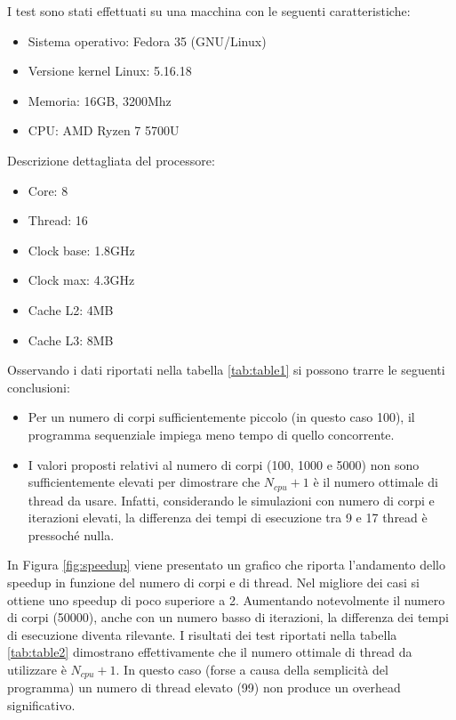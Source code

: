 \documentclass[12pt,a4paper,openright,twoside]{book}
\begin{document}
I test sono stati effettuati su una macchina con le seguenti caratteristiche:
\begin{itemize}
	\item Sistema operativo: Fedora 35 (GNU/Linux)
	\item Versione kernel Linux: 5.16.18
	\item Memoria: 16GB, 3200Mhz
	\item CPU: AMD Ryzen 7 5700U
\end{itemize}
Descrizione dettagliata del processore:
\begin{itemize}
	\item Core: 8
	\item Thread: 16
	\item Clock base: 1.8GHz
	\item Clock max: 4.3GHz
	\item Cache L2: 4MB
	\item Cache L3: 8MB
\end{itemize}

Osservando i dati riportati nella tabella \ref{tab:table1}
si possono trarre le seguenti conclusioni:
\begin{itemize}
	\item Per un numero di corpi sufficientemente piccolo (in questo caso 100),
	il programma sequenziale impiega meno tempo di quello concorrente.
	\item I valori proposti relativi al numero di corpi (100, 1000 e 5000) non sono sufficientemente elevati per
	dimostrare che $N_{cpu}+1$ è il numero ottimale di thread da usare. Infatti, considerando
	le simulazioni con numero di corpi e iterazioni elevati, la differenza dei tempi di esecuzione tra 9 e 17 thread è pressoché nulla.
\end{itemize}

In Figura \ref{fig:speedup} viene presentato un grafico che riporta l'andamento dello speedup in funzione del numero di corpi e di thread.
Nel migliore dei casi si ottiene uno speedup di poco superiore a 2.
Aumentando notevolmente il numero di corpi (50000), anche con un numero basso di iterazioni,
la differenza dei tempi di esecuzione diventa rilevante.
I risultati dei test riportati nella tabella \ref{tab:table2} dimostrano effettivamente che
il numero ottimale di thread da utilizzare è $N_{cpu} + 1$. In questo caso (forse a causa della semplicità del programma)
un numero di thread elevato (99) non produce un overhead significativo.
\end{document}
